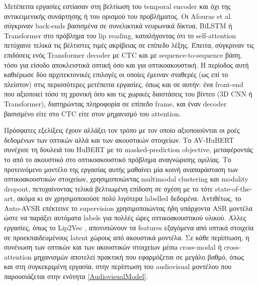 Μετέπειτα εργασίες εστίασαν στη βελτίωση του temporal encoder και όχι της αντικειμενικής συνάρτησης ή του ορισμού του προβλήματος. Οι Afouras et al. \cite{Afouras18c} σύγκριναν back-ends βασισμένα σε συνελικτικά νευρωνικά δίκτυα, BiLSTM ή Transformer στο πρόβλημα του lip reading, καταλήγοντας ότι το self-attention πετύχαινε τελικά τις βέλτιστες τιμές ακρίβειας σε επίπεδο λέξης. Έπειτα, σύγκριναν τις επιδόσεις ενός Transformer decoder με CTC και με sequence-to-sequence βάση, τόσο για είσοδο αποκλειστικά οπτική όσο και για οπτικοακουστική. Η περίοδος αυτή καθιέρωσε δύο αρχιτεκτονικές επιλογές οι οποίες έμειναν σταθερές (ως επί το πλείστον) στις περισσότερες μετέπειτα εργασίες, όπως και σε αυτήν: ένα front-end που αξιοποιεί τόσο τη χρονική όσο και τις χωρικές διαστάσεις του βίντεο (3D CNN ή Transformer), διατηρώντας πληροφορία σε επίπεδο frame, και έναν decoder βασισμένο είτε στο CTC είτε στον μηχανισμό του attention.

Πρόσφατες εξελίξεις έχουν αλλάξει τον τρόπο με τον οποίο αξιοποιούνται οι ροές δεδομένων των οπτικών αλλά και των ακουστικών στοιχείων. Το AV-HuBERT \cite{shi2022learningaudiovisualspeechrepresentation} συνέχισε τη δουλειά του HuBERT \cite{hsu2021hubertselfsupervisedspeechrepresentation} με το masked-prediction objective, μεταφέροντάς το από το ακουστικό στο οπτικοακουστικό πρόβλημα αναγνώρισης ομιλίας. Το προτεινόμενο μοντέλο της εργασίας αυτής μαθαίνει μία κοινή αναπαράσταση των οπτικοακουστικών στοιχείων, χρησιμοποιώντας multimodal clustering και modality dropout, πετυχαίνοντας τελικά βελτιωμένη επίδοση σε σχέση με το τότε state-of-the-art, ακόμα κι αν χρησιμοποιούσε πολύ λιγότερα labelled δεδομένα. Αντιθέτως, το Auto-AVSR \cite{Ma_2023} επέκτεινε το supervision χρησιμοποιώντας ήδη υπάρχοντα ASR μοντέλα ώστε να παράξει αυτόματα labels για πολλές ώρες οπτικοακουστικού υλικού. Άλλες εργασίες, όπως το Lip2Vec \cite{djilali2023lip2vecefficientrobustvisual}, αποτυπώνουν τα features εξαγόμενα από οπτικά στοιχεία σε προεκπαιδευμένους latent χώρους από ακουστικά μοντέλα. Σε κάθε περίπτωση, η συνένωση των οπτικών και των ακουστικών στοιχείων μέσω cross-modal ή cross-attention μηχανισμών αποτελεί πρακτική που εφαρμόζεται σε μεγάλο βαθμό, όπως και στη συγκεκριμένη εργασία, στην περίπτωση του audiovisual μοντέλου που παρουσιάζεται στην ενότητα \ref{AudiovisualModel}.

